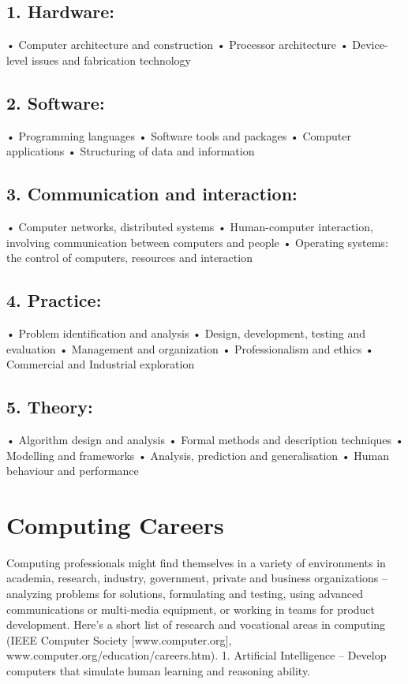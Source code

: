 \documentclass[a4paper,12pt]{article}
\begin{document}
\subsection{1. Hardware:}

• Computer architecture and construction
• Processor architecture
• Device-level issues and fabrication technology

\subsection{2. Software:}

• Programming languages
• Software tools and packages
• Computer applications
• Structuring of data and information
\subsection{3. Communication and interaction:}

• Computer networks, distributed systems
• Human-computer interaction, involving communication between computers and people
• Operating systems: the control of computers, resources and interaction

\subsection{4. Practice:}
• Problem identification and analysis
• Design, development, testing and evaluation
• Management and organization
• Professionalism and ethics
• Commercial and Industrial exploration

\subsection{5. Theory:}

• Algorithm design and analysis
• Formal methods and description techniques
• Modelling and frameworks
• Analysis, prediction and generalisation
• Human behaviour and performance
\section{Computing Careers}

Computing professionals might find themselves in a variety of environments in academia, research, industry, government, private and business organizations – analyzing problems for solutions, formulating and testing, using advanced communications or multi-media equipment, or working in teams for product development. Here’s a short list of research and vocational areas in computing (IEEE Computer Society [www.computer.org], www.computer.org/education/careers.htm).
1. Artificial Intelligence – Develop computers that simulate human learning and reasoning ability.
\end{document}
